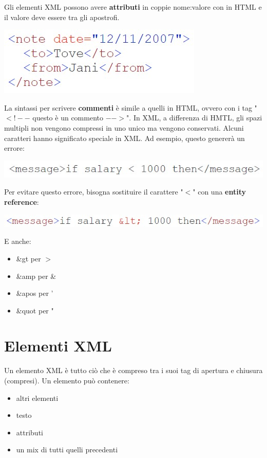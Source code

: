 Gli elementi XML possono avere \textbf{attributi} in coppie nome:valore con in HTML e il valore deve essere tra gli apostrofi. 
\begin{center}
    \includegraphics[scale=0.4]{Images/TecnologieWeb/5/NoteDAte.jpg}
\end{center}
La sintassi per scrivere \textbf{commenti} è simile a quelli in HTML, ovvero con i tag "$<!-- $ questo è un commento $-->$". In XML, a differenza di HMTL, gli spazi multipli non vengono compressi in uno unico ma vengono conservati. Alcuni caratteri hanno significato speciale in XML. Ad esempio, questo genererà un errore:
\begin{center}
    \includegraphics[scale=0.4]{Images/TecnologieWeb/5/MessageIfSalarySbagliat.jpg}
\end{center}
Per evitare questo errore, bisogna sostituire il carattere "$<$" con una \textbf{entity reference}:
\begin{center}
    \includegraphics[scale=0.4]{Images/TecnologieWeb/5/MessageIfSalaryGiusto.jpg}
\end{center}
E anche:
\begin{itemize}
    \item \&gt per $>$
    \item \&amp per \&
    \item \&apos per '
    \item \&quot per "
\end{itemize}

\section{Elementi XML}
Un elemento XML è tutto ciò che è compreso tra i suoi tag di apertura e chiusura (compresi). Un elemento può contenere:
\begin{itemize}
    \item altri elementi
    \item testo
    \item attributi
    \item un mix di tutti quelli precedenti
\end{itemize}

